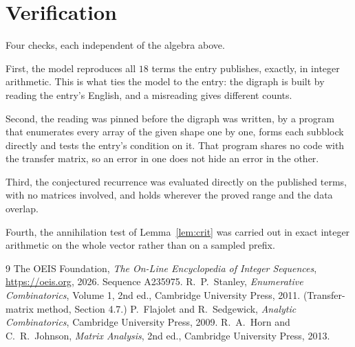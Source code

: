\documentclass[11pt,a4paper]{article}
\theoremstyle{plain}
\theoremstyle{definition}
\begin{document}
\section{Verification}

Four checks, each independent of the algebra above.

First, the model reproduces all $18$ terms the entry publishes, exactly, in integer
arithmetic. This is what ties the model to the entry: the digraph is built by reading the
entry's English, and a misreading gives different counts.

Second, the reading was pinned before the digraph was written, by a program that enumerates
every array of the given shape one by one, forms each subblock directly and tests the entry's
condition on it. That program shares no code with the transfer matrix, so an error in one does
not hide an error in the other.

Third, the conjectured recurrence was evaluated directly on the published terms, with no
matrices involved, and holds wherever the proved range and the data overlap.

Fourth, the annihilation test of Lemma~\ref{lem:crit} was carried out in exact integer
arithmetic on the whole vector rather than on a sampled prefix.

\begin{thebibliography}{9}
 The OEIS Foundation, \emph{The On-Line Encyclopedia of Integer
Sequences}, \url{https://oeis.org}, 2026. Sequence A235975.
 R.~P.~Stanley, \emph{Enumerative Combinatorics}, Volume 1, 2nd ed.,
Cambridge University Press, 2011. (Transfer-matrix method, Section 4.7.)
 P.~Flajolet and R.~Sedgewick, \emph{Analytic Combinatorics}, Cambridge
University Press, 2009.
 R.~A.~Horn and C.~R.~Johnson, \emph{Matrix Analysis}, 2nd ed., Cambridge
University Press, 2013.
\end{thebibliography}
\end{document}
